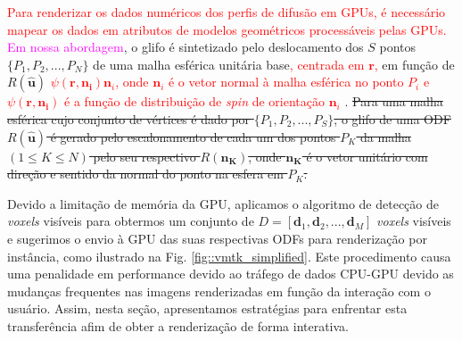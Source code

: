 \documentclass[
    12pt,                %
    oneside,            %
    a4paper,            %
    english,            %
    french,                %
    spanish,            %
    brazil                %
    ]{abntex2}
\begin{document}
\textcolor{red}{Para renderizar os dados numéricos dos perfis de difusão em GPUs, é necessário mapear os dados em atributos de modelos geométricos processáveis pelas GPUs.} \textcolor{magenta}{Em nossa abordagem}, o glifo é sintetizado pelo deslocamento dos $S$ pontos  $\{
P_1,
P_2, ...,
P_N
\}$
de uma malha esférica unitária base\textcolor{red}{, centrada em $\mathbf{r}$,} em função de \sout{$R(\mathbf{\hat{u}})$} \textcolor{red}{$\psi (\mathbf{r, \mathbf{n}_i}) \mathbf{n}_i$, onde $\mathbf{n}_i$ é o vetor normal à malha esférica no ponto $P_i$ e $\psi (\mathbf{r, \mathbf{n}_i})$ é a função de distribuição de \textit{spin} de orientação $\mathbf{n}_i$} . \sout{Para uma malha esférica cujo conjunto de vértices é dado por $\{
P_1,
P_2, ...,
P_S
\}$, o glifo de uma ODF $R(\mathbf{\hat{u}})$ é gerado pelo escalonamento de cada um dos pontos $P_K$ da malha $(1 \leq K \leq N)$ pelo seu respectivo $R(\mathbf{n_K})$, onde $\mathbf{n_K}$ é o vetor unitário com direção e sentido da normal do ponto na esfera em $P_K$.}




Devido a limitação de memória da GPU,  aplicamos o algoritmo de detecção de \textit{voxels} visíveis \cite{voltoline2021} para obtermos um conjunto de $D = [
\mathbf{d}_1,
\mathbf{d}_2, ..., 
\mathbf{d}_M
]$ \textit{voxels} visíveis e sugerimos o envio à GPU das suas respectivas ODFs para renderização por instância, como ilustrado na Fig. \ref{fig::vmtk_simplified}. Este procedimento causa uma penalidade em performance devido ao tráfego de dados CPU-GPU devido as mudanças frequentes nas imagens renderizadas em função da interação com o usuário. Assim, nesta seção, apresentamos estratégias para enfrentar esta transferência afim de obter a renderização de forma interativa.
\end{document}
